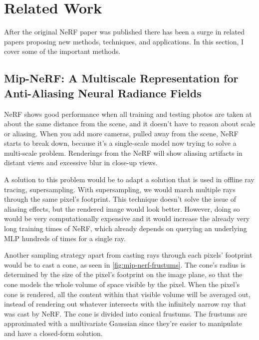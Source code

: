 


\section{Related Work}
After the original NeRF paper was published there has been a surge in related papers proposing new methods, techniques, and applications. In this section, I cover some of the important methods.

\subsection{Mip-NeRF: A Multiscale Representation for Anti-Aliasing Neural Radiance Fields} \label{sec:mipnerf}
NeRF shows good performance when all training and testing photos are taken at about the same distance from the scene, and it doesn't have to reason about scale or aliasing. When you add more cameras, pulled away from the scene, NeRF starts to break down, because it's a single-scale model now trying to solve a multi-scale problem. Renderings from the NeRF will show aliasing artifacts in distant views and excessive blur in close-up views.

A solution to this problem would be to adapt a solution that is used in offline ray tracing, supersampling. With supersampling, we would march multiple rays through the same pixel's footprint. This technique doesn't solve the issue of aliasing effects, but the rendered image would look better. However, doing so would be very computationally expensive and it would increase the already very long training times of NeRF, which already depends on querying an underlying MLP hundreds of times for a single ray.

Another sampling strategy apart from casting rays through each pixels' footprint would be to cast a cone, as seen in \autoref{fig:mip-nerf-frustums}. The cone's radius is determined by the size of the pixel's footprint on the image plane, so that the cone models the whole volume of space visible by the pixel. When the pixel's cone is rendered, all the content within that visible volume will be averaged out, instead of rendering out whatever intersects with the infinitely narrow ray that was cast by NeRF. The cone is divided into conical frustums. The frustums are approximated with a multivariate Gaussian since they're easier to manipulate and have a closed-form solution.

